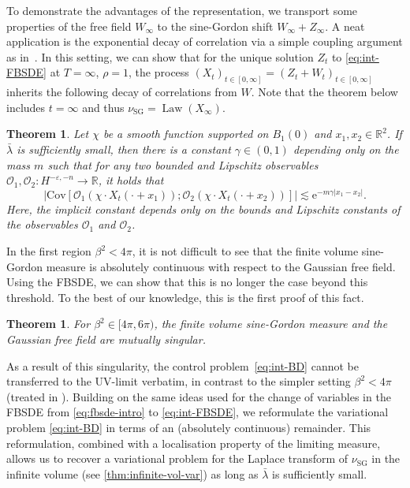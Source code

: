 \documentclass[11pt, a4paper]{scrartcl}
\numberwithin{equation}{section}
\theoremstyle{plain}
\newtheorem{theorem}[foo]{Theorem}
\theoremstyle{remark}
\newcommand{\mathe}{\mathrm{e}}
\newcommand{\tmop}[1]{\ensuremath{\operatorname{#1}}}
\begin{document}
To demonstrate the advantages of the representation, we transport some
properties of the free field $W_{\infty}$ to the sine-Gordon shift $W_{\infty}
	+ Z_{\infty}$. A neat application is the exponential decay of correlation via
a simple coupling argument as
in~{\cite{vecchiStochasticAnalysisSubcritical2025, gubinelliDecayCorrelationsStochastic2025}}.
In this setting, we can show that for the unique solution $Z_t$ to
\eqref{eq:int-FBSDE} at $T = \infty$, $\rho = 1$, the process $(X_t)_{t \in
			[0, \infty]} = (Z_t + W_t)_{t \in [0, \infty]}$ inherits the following decay
of correlations from $W$. Note that the theorem below includes $t = \infty$
and thus $\nu_{\tmop{SG}} = \tmop{Law} (X_{\infty})$.

\begin{theorem}
	\label{thm:decay-of-correlations}Let $\chi$ be a smooth function supported
	on $B_1 (0)$ and $x_1, x_2 \in \mathbb{R}^2$. If $\bar{\lambda}$ is sufficiently small,
	then there is a constant
	$\gamma \in (0, 1)$ depending only on the mass $m$ such that for any two
	bounded and Lipschitz observables $\mathcal{O}_1, \mathcal{O}_2 : H^{-
				\varepsilon, - n} \rightarrow \mathbb{R}$, it holds that
	\[ \left| \mathrm{Cov} [\mathcal{O}_1 (\chi \cdot X_t (\cdot + x_1)) ;
			\mathcal{O}_2 (\chi \cdot X_t (\cdot + x_2))]  \right| \lesssim \mathe^{- m \gamma | x_1 - x_2 |} . \]
	Here, the implicit constant depends only on the bounds and Lipschitz
	constants of the observables $\mathcal{O}_1$ and $\mathcal{O}_2$.
\end{theorem}

In the first region $\beta^2 < 4 \pi$, it is not difficult to see that the
finite volume sine-Gordon measure is absolutely continuous with respect to the
Gaussian free field. Using the FBSDE, we
can show that this is no longer the case beyond this threshold. To the best of
our knowledge, this is the first proof of this fact.

\begin{theorem}
	\label{thm:singularity}For $\beta^2 \in [4 \pi,6\pi)$, the finite volume
	sine-Gordon measure and the Gaussian free field are mutually singular.
\end{theorem}

As a result of this singularity, the control problem~\eqref{eq:int-BD} cannot
be transferred to the UV-limit verbatim, in contrast to the simpler setting
$\beta^2 < 4 \pi$ (treated in {\cite{barashkovStochasticControlApproach2022}}).
Building on the same ideas used for the change of variables in the FBSDE from
\eqref{eq:fbsde-intro} to \eqref{eq:int-FBSDE}, we reformulate the variational
problem \eqref{eq:int-BD} in terms of an (absolutely continuous) remainder.
This reformulation, combined with a localisation property of the limiting
measure, allows us to recover a variational problem for the Laplace transform
of $\nu_{\tmop{SG}}$ in the infinite volume (see \ref{thm:infinite-vol-var}) as long as $\bar{\lambda}$ is sufficiently small.
\end{document}
